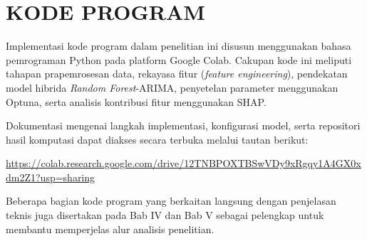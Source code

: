 \clearpage
\chapter{KODE PROGRAM}
\label{chap:kode_program}

Implementasi kode program dalam penelitian ini disusun menggunakan bahasa pemrograman Python pada platform Google Colab. Cakupan kode ini meliputi tahapan prapemrosesan data, rekayasa fitur (\textit{feature engineering}), pendekatan model hibrida \textit{Random Forest}-ARIMA, penyetelan parameter menggunakan Optuna, serta analisis kontribusi fitur menggunakan SHAP.

Dokumentasi mengenai langkah implementasi, konfigurasi model, serta repositori hasil komputasi dapat diakses secara terbuka melalui tautan berikut:

\begin{center}
    \small\url{https://colab.research.google.com/drive/12TNBPOXTBSwVDy9xRgqy1A4GX0xdm2Z1?usp=sharing}
\end{center}

Beberapa bagian kode program yang berkaitan langsung dengan penjelasan teknis juga disertakan pada Bab IV dan Bab V sebagai pelengkap untuk membantu memperjelas alur analisis penelitian.